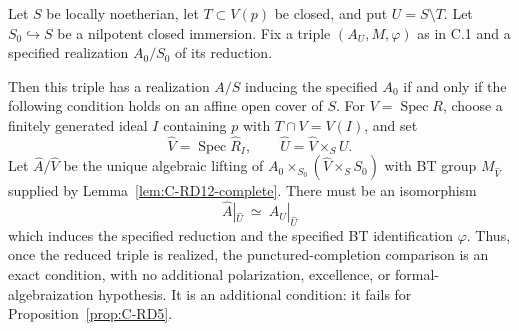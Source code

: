 \begin{theorem}
\label{thm:C-RD12}
Let $S$ be locally noetherian, let $T\subset V(p)$ be closed, and put
$U=S\setminus T$. Let $S_0\hookrightarrow S$ be a nilpotent closed
immersion. Fix a triple $(A_U,M,\varphi)$ as in C.1 and a specified
realization $A_0/S_0$ of its reduction.

Then this triple has a realization $A/S$ inducing the specified
$A_0$ if and only if the following condition holds on an affine open
cover of $S$. For $V=\operatorname{Spec}R$, choose a finitely generated
ideal $I$ containing $p$ with $T\cap V=V(I)$, and set
\[
 \widehat V=\operatorname{Spec}\widehat R_I,
 \qquad \widehat U=\widehat V\times_S U.
\]
Let $\widehat A/\widehat V$ be the unique algebraic lifting of
$A_0\times_{S_0}(\widehat V\times_SS_0)$ with BT group
$M_{\widehat V}$ supplied by Lemma~\ref{lem:C-RD12-complete}.
There must be an isomorphism
\[
 \widehat A|_{\widehat U}\ \simeq\ A_U|_{\widehat U}
                                                        \tag{C-RD12.1}
\]
which induces the specified reduction and the specified BT
identification $\varphi$. Thus, once the reduced triple is realized,
the punctured-completion comparison is an exact condition, with no
additional polarization, excellence, or formal-algebraization
hypothesis. It is an additional condition: it fails for
Proposition~\ref{prop:C-RD5}.
\end{theorem}
